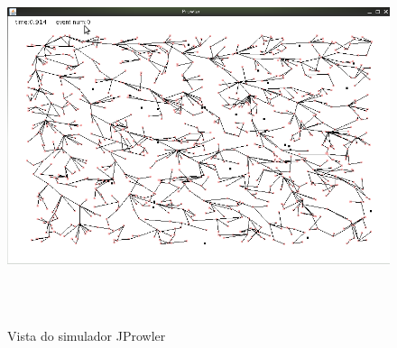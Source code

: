 \begin{figure}[H]
\centering
\includegraphics[height=11cm,width=16cm]{Jprowler.png}
\caption{Vista do simulador JProwler} \label{fig:jprowler}
\end{figure}
